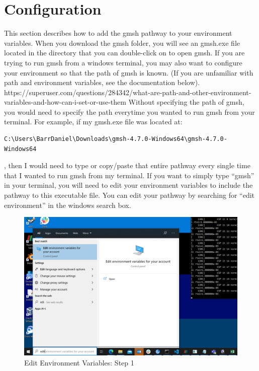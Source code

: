 \documentclass{report}
\begin{document}
\section{Configuration}
This section describes how to add the gmsh pathway to your environment variables. \newline \newline
When you download the gmsh folder, you will see an gmsh.exe file located in the directory that you can double-click on to open gmsh. If you are trying to run gmsh from a windows terminal, you may also want to configure your environment so that the path of gmsh is known. (If you are unfamiliar with path and environment variables, see the documentation below). \newline \newline
https://superuser.com/questions/284342/what-are-path-and-other-environment-variables-and-how-can-i-set-or-use-them \newline \newline
Without specifying the path of gmsh, you would need to specify the path everytime you wanted to run gmsh from your terminal. For example, if my gmsh.exe file was located at: \begin{verbatim}
C:\Users\BarrDaniel\Downloads\gmsh-4.7.0-Windows64\gmsh-4.7.0-Windows64 \end{verbatim}  
, then I would need to type or copy/paste that entire pathway every single time that I wanted to run gmsh from my terminal. If you want to simply type ``gmsh'' in your terminal, you will need to edit your environment variables to include the pathway to this executable file. You can edit your pathway by searching for ``edit environment'' in the windows search box. \newline
\begin{figure}[h]
  \centering
  \includegraphics[width=15cm]{EditEnviron.png}
  \setcaptionwidth{15cm}
  \caption{Edit Environment Variables: Step 1}
  \label{TSDA_connected_bodies}
\end{figure}
\end{document}
